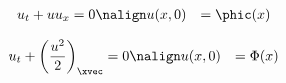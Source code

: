 \begin{defnbox}\nospacing
    \begin{defn}[\blackrb{Inviscid} Burgers Equation\hfill\tcblack{$\flux=\left(\frac{u^{2}}{2}\right)$}]\label{defn:inviscid_burgers_equation}
    \begin{align}
        u_t+u u_x&=0 \nonumber\nalign
        u(x,0)&=\phic(x)\label{eq:Burgers Equation}
    \end{align}
    \end{defn}
\end{defnbox}
\begin{corbox}\nospacing
    \begin{cor}\label{cor:burgers_equation_conservative_formulation}
        \begin{align}
            u_t+\left(\frac{u^{2}}{2}\right)_{\xvec}&=0 \nonumber\nalign
            u(x,0)&=\Phi(x)\label{eq:Burgers Equation}
        \end{align}
    \end{cor}
\end{corbox}

